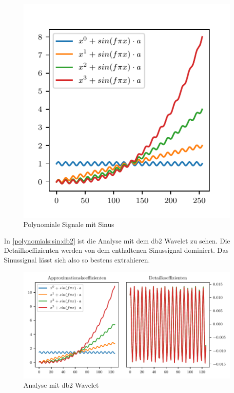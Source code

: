 \begin{refsection}
\begin{figure}
    \centering
    \includegraphics{papers/polynomials/images/polynomials_sin_signals.pdf}
    \caption{Polynomiale Signale mit Sinus\label{polynomials:sin:signals}}
\end{figure}

In \autoref{polynomials:sin:db2} ist die Analyse mit dem db2 Wavelet zu sehen.
Die Detailkoeffizienten werden von dem enthaltenen Sinussignal dominiert. Das
Sinussignal lässt sich also so bestens extrahieren.

\begin{figure}
    \centering
    \includegraphics{papers/polynomials/images/polynomials_sin_db2.pdf}
    \caption{Analyse mit db2 Wavelet\label{polynomials:sin:db2}}
\end{figure}


\end{refsection}
